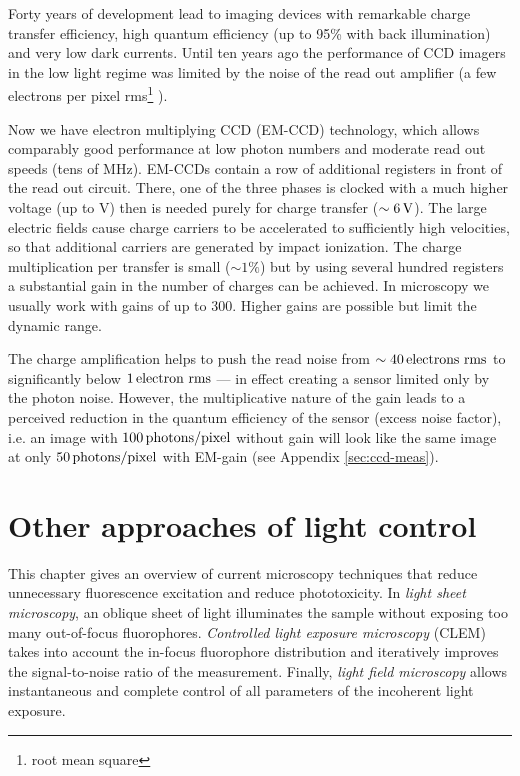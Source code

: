 Forty years of development lead to imaging devices with remarkable
charge transfer efficiency, high quantum efficiency (up to 95\% with
back illumination) and very low dark currents. Until ten years ago the
performance of CCD imagers in the low light regime was limited by the
noise of the read out amplifier (a few electrons per pixel
rms\footnote{root mean square} ).

Now we have electron multiplying CCD (EM-CCD)
 technology,
which allows comparably good performance at low photon numbers
\citep{Mackay,Robbins2003} and moderate read out speeds (tens of
MHz). EM-CCDs contain a row of additional registers in front of the
read out circuit. There, one of the three phases is clocked with a
much higher voltage (up to \unit[40]{V}) then is needed purely for
charge transfer ($\unit[\sim6]{V}$). The large electric fields cause
charge carriers to be accelerated to sufficiently high velocities, so
that additional carriers are generated by impact ionization. The
charge multiplication per transfer is small ($\sim1\%$) but by using
several hundred registers a substantial gain in the number of charges
can be achieved. In microscopy we usually work with gains of up to
300. Higher gains are possible but limit the dynamic range.

The charge amplification helps to push the read noise from
$\sim\unit[40]{electrons\ rms}$ to significantly below
$\unit[1]{electron\ rms}$ --- in effect creating a sensor limited only
by the photon noise. However, the multiplicative nature of the gain
leads to a perceived reduction in the quantum efficiency of the sensor
(excess noise factor), i.e. an image with $\unit[100]{photons/pixel}$
without gain will look like the same image at only
$\unit[50]{photons/pixel}$ with EM-gain (see Appendix
\ref{sec:ccd-meas}).


\chapter{Other approaches of light control}
\label{sec:approaches}
%
\begin{summary}
  This chapter gives an overview of current microscopy techniques that
  reduce unnecessary fluorescence excitation and reduce
  phototoxicity. In \emph{light sheet microscopy}, an oblique sheet of
  light illuminates the sample without exposing too many out-of-focus
  fluorophores. \emph{Controlled light exposure microscopy} (CLEM)
  takes into account the in-focus fluorophore distribution and
  iteratively improves the signal-to-noise ratio of the measurement.
  Finally, \emph{light field microscopy} allows instantaneous and
  complete control of all parameters of the incoherent light exposure.
\end{summary}
